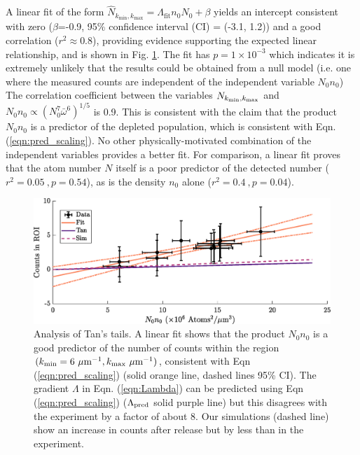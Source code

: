 	A linear fit of the form $\hat{N}_{k_\textrm{min},k_\textrm{max}} = \Lambda_\textrm{fit} n_0 N_0 + \beta$ yields {an intercept} %
	consistent with zero ($\beta$=-0.9,  95\% confidence interval (CI) = (-3.1, 1.2)) and a good correlation ($r^2\approx0.8$), providing evidence supporting the expected linear relationship, and is shown in Fig. \ref{fig:exp_results}. 
	The fit has $p=1\times10^{-3}$ which indicates it is extremely unlikely that the results could be obtained from a null model (i.e. one where the measured counts are independent of the independent variable $N_0 n_0$)
	The correlation coefficient between the %
	variables {$N_{k_{\rm min},k_{\rm max}}$} %
	and $N_0n_0\propto(N_0^7\bar{\omega}^6)^{1/5}$ is 0.9.
	This is consistent with the claim that the product $N_0n_0$ is a predictor of the depleted population, which is consistent with Eqn. (\ref{eqn:pred_scaling}).
	No other physically-motivated combination of the independent variables provides a better fit.
	For comparison, a linear fit proves that the atom number {$N$} itself is a poor predictor of the detected number ($r^2=0.05~,p=0.54$), as is the density {$n_0$} alone ($r^2=0.4~,p=0.04$).

		\begin{figure}
	\begin{center}
		\includegraphics[width=\columnwidth]{fig/QD/regression_results}
			\caption{{Analysis of Tan's tails.} A linear fit shows that the product $N_0n_0$ is a good predictor of the number of counts within the region $(k_\textrm{min}=6~\mu\textrm{m}^{-1},k_\textrm{max}~\mu\textrm{m}^{-1})$, consistent with Eqn (\ref{eqn:pred_scaling}) 
			(solid orange line, dashed lines 95\% CI). The gradient {$\Lambda$} %
			{in Eqn. (\ref{eqn:Lambda})} can be predicted using Eqn (\ref{eqn:pred_scaling}) ({$\Lambda_{\rm pred}$} solid purple line) but this disagrees with the experiment by a factor of about 8. Our simulations (dashed line) show an increase in counts after release but by less than in the experiment. 
			}

		\label{fig:exp_results}
	\end{center}
	\end{figure}


